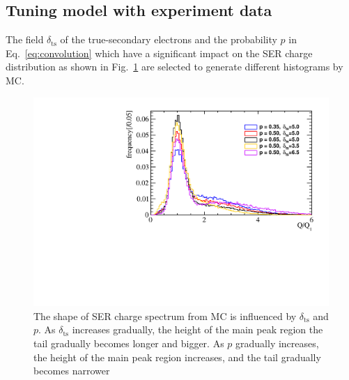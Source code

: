 \subsection{Tuning model with experiment data}\label{subsec:chitest}
The field $\delta_{\mathrm{ts}}$ of the true-secondary electrons and the probability $p$ in Eq.~\eqref{eq:convolution}
which have a significant impact on the SER charge distribution as shown in Fig.~\ref{fig:tsp} are selected
to generate different histograms by MC.
\begin{figure}[ht]
    \centering
    \includegraphics[width=0.6\linewidth]{pic/pts.pdf}
    \caption{The shape of SER charge spectrum from MC is influenced by $\delta_{\mathrm{ts}}$ and $p$.
        As $\delta_{\mathrm{ts}}$ increases gradually, the height of the main peak region the tail gradually becomes longer and bigger.
        As $p$ gradually increases, the height of the main peak region increases, and the tail gradually becomes narrower
    }
    \label{fig:tsp}
\end{figure}


